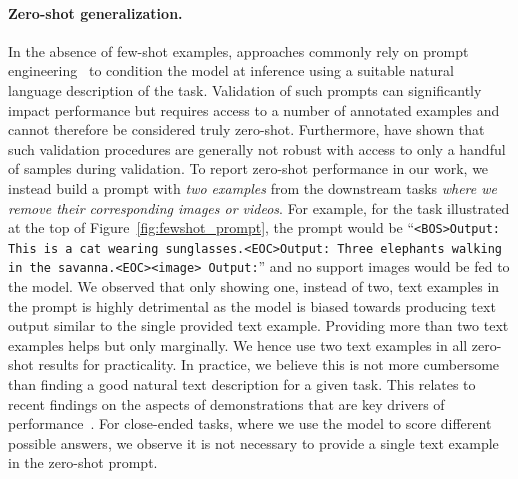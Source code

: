 \paragraph{Zero-shot generalization.}
In the absence of few-shot examples, approaches commonly rely on prompt engineering~\citep{clip} to condition the model at inference using a suitable natural language description of the task.
Validation of such prompts can significantly impact performance but requires access to a number of annotated examples and cannot therefore be considered truly zero-shot.
Furthermore, \citet{truefewshot} have shown that such validation procedures are generally not robust with access to only a handful of samples during validation.
To report zero-shot performance in our work,
we instead build a prompt with \emph{two examples} from the downstream tasks \emph{where we remove their corresponding images or videos}.
For example, for the task illustrated at the top of Figure~\ref{fig:fewshot_prompt}, the prompt would be ``{\small \texttt{\color{greencode}<BOS>Output: This is a cat wearing sunglasses.<EOC>Output: Three elephants walking in the savanna.<EOC><image> Output:}}'' and no support images would be fed to the model.
We observed that only showing one, instead of two, text examples in the prompt is highly detrimental as the model is biased towards producing text output similar to the single provided text example.
Providing more than two text examples helps but only marginally.
We hence use two text examples in all zero-shot results for practicality.
In practice, we believe this is not more cumbersome than finding a good natural text description for a given task.
This relates to recent findings on the aspects of demonstrations that are key drivers of  performance~\citep{min2022rethinking}.
For close-ended tasks, where we use the model to score different possible answers, we observe it is not necessary to provide a single text example in the zero-shot prompt.

